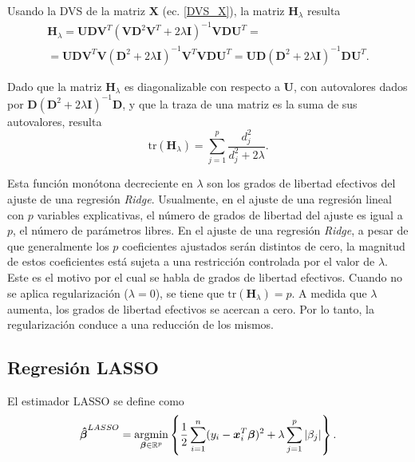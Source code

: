 \documentclass[a4paper,12pt]{report}
\begin{document}
Usando la DVS de la matriz $\boldsymbol{X}$ (ec. \ref{DVS_X}), la matriz $\boldsymbol{H}_\lambda$ resulta
\begin{gather}
\nonumber
\boldsymbol{H}_\lambda=\boldsymbol{UDV}^T(\boldsymbol{VD}^2\boldsymbol{V}^T+2\lambda\boldsymbol{I})^{-1}\boldsymbol{VDU}^T= \\
=\boldsymbol{UDV}^T\boldsymbol{V}(\boldsymbol{D}^2+2\lambda \boldsymbol{I})^{-1}\boldsymbol{V}^T\boldsymbol{VDU}^T=
\boldsymbol{UD}(\boldsymbol{D}^2+2\lambda \boldsymbol{I})^{-1}\boldsymbol{DU}^T.
\end{gather}

Dado que la matriz $\boldsymbol{H}_\lambda$ es diagonalizable con respecto a $\boldsymbol{U}$, con autovalores dados por $\boldsymbol{D}(\boldsymbol{D}^2+2\lambda \boldsymbol{I})^{-1}\boldsymbol{D}$, y que la traza de una matriz es la suma de sus autovalores, resulta
\begin{equation}
\text{tr}(\boldsymbol{H}_\lambda)=\sum_{j=1}^p\frac{d_j^2}{d_j^2+2\lambda}.
\end{equation}

Esta función monótona decreciente en $\lambda$ son los grados de libertad efectivos del ajuste de una regresión \textit{Ridge}. Usualmente, en el ajuste de una regresión lineal con $p$ variables explicativas, el número de grados de libertad del ajuste es igual a $p$, el número de parámetros libres. En el ajuste de una regresión \textit{Ridge}, a pesar de que generalmente los $p$ coeficientes ajustados serán distintos de cero, la magnitud de estos coeficientes está sujeta a una restricción controlada por el valor de $\lambda$. Este es el motivo por el cual se habla de grados de libertad efectivos. Cuando no se aplica regularización ($\lambda=0$), se tiene que $\text{tr}(\boldsymbol{H}_\lambda)=p$. A medida que $\lambda$ aumenta, los grados de libertad efectivos se acercan a cero. Por lo tanto, la regularización conduce a una reducción de los mismos.

\subsection{Regresión LASSO}
El estimador LASSO se define como
\begin{equation}
\label{BETA_LASSO}
\boldsymbol{\hat{\beta}}^{LASSO}=\operatornamewithlimits{argmin}\limits_{\boldsymbol{\beta} \in \mathbb{R}^p} \left\{ \frac{1}{2} \sum_{i=1}^n (y_i-\boldsymbol{x}_i^T\boldsymbol{\beta})^2+\lambda \sum_{j=1}^p |\beta_j| \right\}.
\end{equation}
\end{document}
